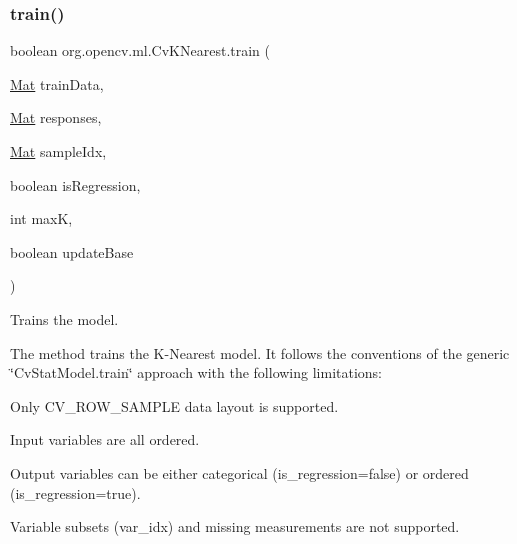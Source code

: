 \subsubsection{\texorpdfstring{train()}{train()}\hspace{0.1cm}{\footnotesize\ttfamily [1/2]}}
{\footnotesize\ttfamily boolean org.\+opencv.\+ml.\+Cv\+K\+Nearest.\+train (\begin{DoxyParamCaption}\item[{\mbox{\hyperlink{classorg_1_1opencv_1_1core_1_1_mat}{Mat}}}]{train\+Data,  }\item[{\mbox{\hyperlink{classorg_1_1opencv_1_1core_1_1_mat}{Mat}}}]{responses,  }\item[{\mbox{\hyperlink{classorg_1_1opencv_1_1core_1_1_mat}{Mat}}}]{sample\+Idx,  }\item[{boolean}]{is\+Regression,  }\item[{int}]{maxK,  }\item[{boolean}]{update\+Base }\end{DoxyParamCaption})}

Trains the model.

The method trains the K-\/\+Nearest model. It follows the conventions of the generic \char`\"{}\+Cv\+Stat\+Model.\+train\char`\"{} approach with the following limitations\+:


\begin{DoxyItemize}
\item Only {\ttfamily C\+V\+\_\+\+R\+O\+W\+\_\+\+S\+A\+M\+P\+LE} data layout is supported. 
\item Input variables are all ordered. 
\item Output variables can be either categorical ({\ttfamily is\+\_\+regression=false}) or ordered ({\ttfamily is\+\_\+regression=true}). 
\item Variable subsets ({\ttfamily var\+\_\+idx}) and missing measurements are not supported. 
\end{DoxyItemize}



